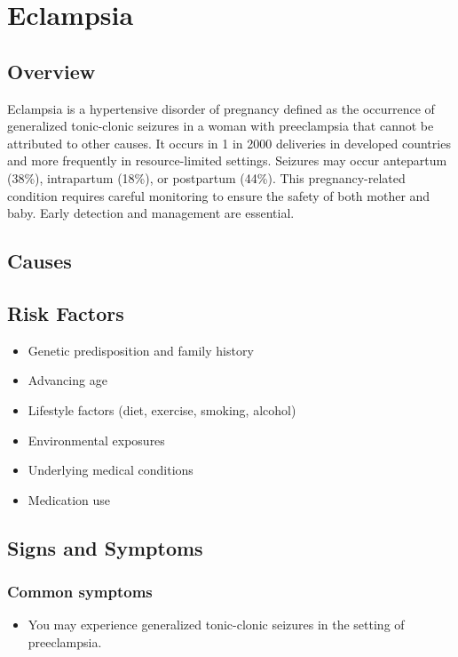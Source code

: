 \chapter{Eclampsia}
\label{sec:Eclampsia}

\section{Overview}
Eclampsia is a hypertensive disorder of pregnancy defined as the occurrence of generalized tonic-clonic seizures in a woman with preeclampsia that cannot be attributed to other causes. It occurs in 1 in 2000 deliveries in developed countries and more frequently in resource-limited settings. Seizures may occur antepartum (38\%), intrapartum (18\%), or postpartum (44\%). This pregnancy-related condition requires careful monitoring to ensure the safety of both mother and baby. Early detection and management are essential.
\section{Causes}
\section{Risk Factors}

\begin{itemize}[noitemsep]
  \item Genetic predisposition and family history
  \item Advancing age
  \item Lifestyle factors (diet, exercise, smoking, alcohol)
  \item Environmental exposures
  \item Underlying medical conditions
  \item Medication use
\end{itemize}
\section{Signs and Symptoms}

\subsection{Common symptoms}
\begin{itemize}[noitemsep]
  \item You may experience generalized tonic-clonic seizures in the setting of preeclampsia. 
  \end{itemize}

